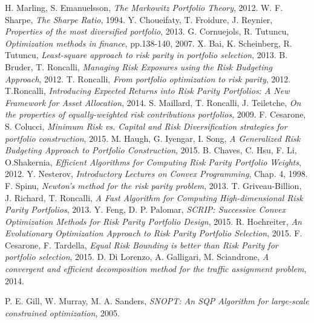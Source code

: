   H. Marling, S. Emanuelsson,
  \emph{The Markowitz Portfolio Theory},
  2012.
  W. F. Sharpe,
  \emph{The Sharpe Ratio},
  1994.
  Y. Choueifaty, T. Froidure, J. Reynier,
  \emph{Properties of the most diversified portfolio},
  2013. 
  G. Cornuejols, R. Tutuncu,
  \emph{Optimization methods in finance}, pp.138-140,
   2007.
  X. Bai, K. Scheinberg, R. Tutuncu,
  \emph{Least-square approach to risk parity in portfolio selection},
  2013.   
  B. Bruder, T. Roncalli,
  \emph{Managing Risk Exposures using the Risk Budgeting Approach},
  2012.   
  T. Roncalli,
  \emph{From portfolio optimization to risk parity},
  2012.
  T.Roncalli,
  \emph{Introducing Expected Returns into Risk Parity Portfolios: A New Framework for Asset Allocation},
  2014.   
  S. Maillard, T. Roncalli, J. Teiletche,
  \emph{On the properties of equally-weighted risk contributions portfolios},
  2009.
  F. Cesarone, S. Colucci,
  \emph{Minimum Risk vs. Capital and Risk Diversification strategies for portfolio construction},
  2015. 
  M. Haugh, G. Iyengar, I. Song, 
  \emph{A Generalized Risk Budgeting Approach to Portfolio Construction},
  2015.
  B. Chaves, C. Hsu, F. Li, O.Shakernia,
  \emph{Efficient Algorithms for Computing Risk Parity Portfolio Weights},
  2012.
  Y. Nesterov,
  \emph{Introductory Lectures on Convex Programming}, Chap. 4,
  1998.
  F. Spinu,
  \emph{Newton's method for the risk parity problem},
  2013.
  T. Griveau-Billion, J. Richard, T. Roncalli,
  \emph{A Fast Algorithm for Computing High-dimensional Risk Parity Portfolios},
  2013.
  Y. Feng, D. P. Palomar,
  \emph{SCRIP: Successive Convex Optimization Methods for Risk Parity Portfolio Design},
  2015.
   R. Hochreiter,
  \emph{An Evolutionary Optimization Approach to Risk Parity Portfolio Selection},
  2015.  
  F. Cesarone, F. Tardella,		
  \emph{Equal Risk Bounding is better than Risk Parity for portfolio selection},
  2015.
D. Di Lorenzo, A. Galligari, M. Sciandrone,
  \emph{A convergent and efficient decomposition method for the traffic assignment problem},
  2014.   

	P. E. Gill, W. Murray, M. A. Sanders,
	\emph{SNOPT: An SQP Algorithm for large-scale constrained optimization}, 
	2005.